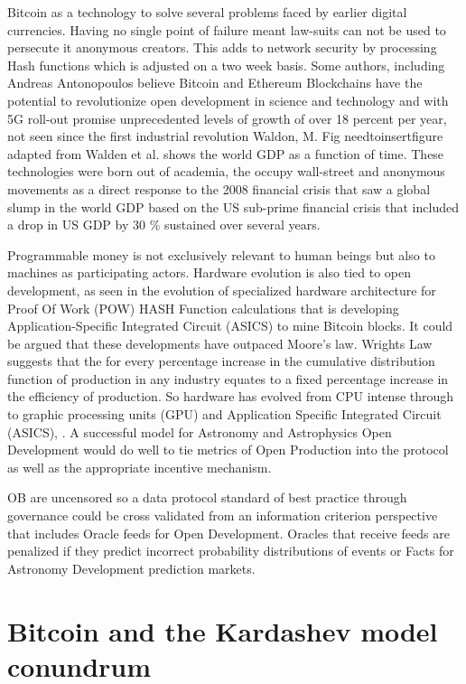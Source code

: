 \documentclass[final,5p,times,twocolumn,authoryear]{elsarticle}
\begin{document}
Bitcoin as a technology to solve several problems faced by earlier digital currencies. Having no single point of failure meant law-suits can not be used to persecute it anonymous creators. This adds to network security by processing Hash functions which is adjusted on a two week basis. Some authors, including Andreas Antonopoulos believe Bitcoin and Ethereum Blockchains have the potential to revolutionize open development in science and technology and with 5G roll-out promise unprecedented levels of growth of over 18 percent per year, not seen since the first industrial revolution Waldon, M.  Fig needtoinsertfigure adapted from Walden et al. shows the world GDP as a function of time. These technologies were born out of academia, the occupy wall-street and anonymous movements as a direct response to the 2008 financial crisis that saw a global slump in the world GDP based on the US sub-prime financial crisis  that included a drop in US GDP by 30 \% sustained over several years.
 
Programmable money is not exclusively relevant to human beings but also to machines as participating actors. Hardware evolution is also tied to open development, as seen in the evolution of specialized hardware architecture for Proof Of Work (POW) HASH Function calculations that is developing Application-Specific Integrated Circuit (ASICS) to mine Bitcoin blocks. It could be argued that these developments have outpaced Moore's law.  Wrights Law suggests that the for every percentage increase in the cumulative distribution function of production in any industry equates to a fixed percentage increase in the efficiency of production. So hardware has evolved from CPU intense through to graphic processing units (GPU) and  Application Specific Integrated Circuit  (ASICS), \cite{10.1371/journal.pone.0052669}. A successful model for Astronomy and Astrophysics Open Development would do well to tie metrics of Open Production into the protocol as well as the appropriate incentive mechanism.       

OB are uncensored so a data protocol standard of best practice through governance could be cross validated from an information criterion perspective that includes Oracle feeds for Open Development.  Oracles that receive feeds are penalized if they predict incorrect probability distributions of events or Facts for Astronomy Development prediction markets. 

\section{Bitcoin and the Kardashev model conundrum}
\label{sec:energy}
\end{document}
